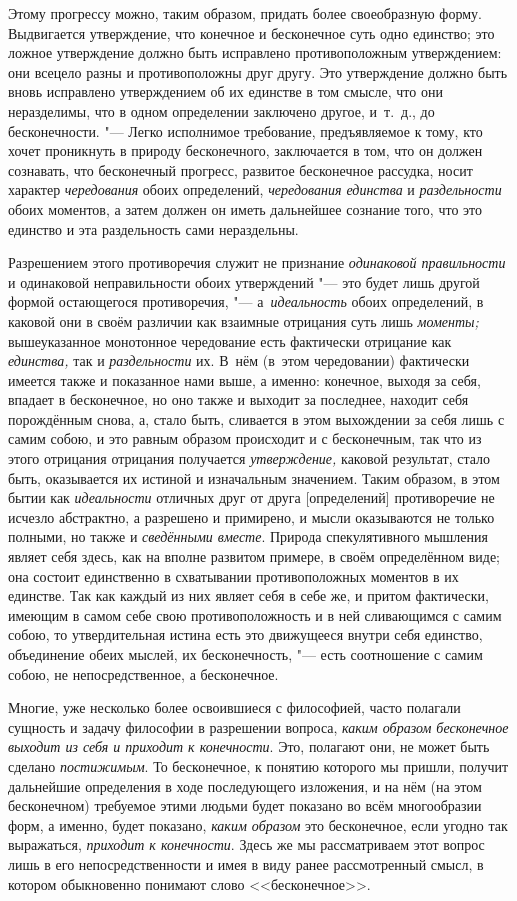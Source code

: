 Этому прогрессу можно, таким образом, придать более своеобразную форму.
Выдвигается утверждение, что конечное и бесконечное суть одно единство; это
ложное утверждение должно быть исправлено противоположным утверждением: они
всецело разны и противоположны друг другу. Это утверждение должно быть
вновь исправлено утверждением об их единстве в том смысле, что они
неразделимы, что в одном определении заключено другое, и~т.~д., до
бесконечности. "--- Легко исполнимое требование, предъявляемое к тому, кто
хочет проникнуть в природу бесконечного, заключается в том, что он должен
сознавать, что бесконечный прогресс, развитое бесконечное рассудка, носит
характер {\em чередования} обоих определений,
{\em чередования единства} и
{\em раздельности} обоих моментов, а затем должен он
иметь дальнейшее сознание того, что это единство и эта раздельность сами
нераздельны.

Разрешением этого противоречия служит не признание
{\em одинаковой правильности} и одинаковой
неправильности обоих утверждений "--- это будет лишь другой формой остающегося
противоречия, "--- а~{\em идеальность} обоих определений,
в каковой они в своём различии как взаимные отрицания суть лишь
{\em моменты;} вышеуказанное монотонное чередование
есть фактически отрицание как {\em единства,} так и
{\em раздельности} их. В~нём (в~этом чередовании)
фактически имеется также и показанное нами выше, а именно: конечное, выходя
за себя, впадает в бесконечное, но оно также и выходит за последнее,
находит себя порождённым снова, а, стало быть, сливается в этом выхождении
за себя лишь с самим собою, и это равным образом происходит и с
бесконечным, так что из этого отрицания отрицания получается
{\em утверждение,} каковой результат, стало быть,
оказывается их истиной и изначальным значением. Таким образом, в этом бытии
как {\em идеальности} отличных друг от друга
[определений] противоречие не исчезло абстрактно, а разрешено и примирено,
и мысли оказываются не только полными, но также и
{\em сведёнными вместе}. Природа спекулятивного
мышления являет себя здесь, как на вполне развитом примере, в своём
определённом виде; она состоит единственно в схватывании противоположных
моментов в их единстве. Так как каждый из них являет себя в себе же, и
притом фактически, имеющим в самом себе свою противоположность и в ней
сливающимся с самим собою, то утвердительная истина есть это движущееся
внутри себя единство, объединение обеих мыслей, их бесконечность, "--- есть
соотношение с самим собою, не непосредственное, а бесконечное.

Многие, уже несколько более освоившиеся с философией, часто полагали
сущность и задачу философии в разрешении вопроса,
{\em каким образом бесконечное выходит из себя и
приходит к конечности}. Это, полагают они, не может быть сделано
{\em постижимым}. То бесконечное, к понятию которого мы
пришли, получит дальнейшие определения в ходе последующего изложения, и на
нём (на этом бесконечном) требуемое этими людьми будет показано во всём
многообразии форм, а именно, будет показано, {\em каким
образом} это бесконечное, если угодно так выражаться,
{\em приходит к конечности}. Здесь же мы рассматриваем
этот вопрос лишь в его непосредственности и имея в виду ранее рассмотренный
смысл, в котором обыкновенно понимают слово <<бесконечное>>.

